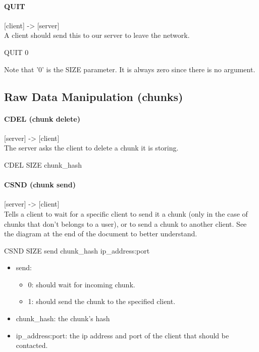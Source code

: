 \documentclass{article}
\begin{document}
\paragraph{QUIT}

[client] -> [server]\\
A client should send this to our server to leave the network.\\

\begin{center}QUIT 0\end{center}

Note that '0' is the SIZE parameter. It is always zero since there is no argument.\\

\subsection{Raw Data Manipulation (chunks)}

\paragraph{CDEL (chunk delete)}

[server] -> [client]\\
The server asks the client to delete a chunk it is storing.

\begin{center}CDEL SIZE chunk\_hash\end{center}

\paragraph{CSND (chunk send)}

[server] -> [client]\\
 Tells a client to wait for a specific client to send it a chunk (only in the case of chunks that don't belongs to a user), or to send a chunk to another client. See the diagram at the end of the document to better understand.

\begin{center}CSND SIZE send chunk\_hash ip\_address:port\end{center}

\begin{itemize}
  \item send: \begin{itemize}
    \item 0: should wait for incoming chunk.
    \item 1: should send the chunk to the specified client.
    \end{itemize}
  \item chunk\_hash: the chunk's hash
  \item ip\_address:port: the ip address and port of the client that should be contacted.
\end{itemize}
    
\end{document}
